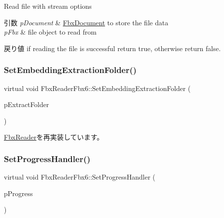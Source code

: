Read file with stream options 
\begin{DoxyParams}{引数}
{\em p\+Document} & \hyperlink{class_fbx_document}{Fbx\+Document} to store the file data \\
\hline
{\em p\+Fbx} & file object to read from \\
\hline
\end{DoxyParams}
\begin{DoxyReturn}{戻り値}
if reading the file is successful return {\ttfamily true}, otherwise return {\ttfamily false}. 
\end{DoxyReturn}
\mbox{\label{class_fbx_reader_fbx6_a574e93fb5fc9fd89050b11c383316ab2}} 
\subsubsection{\texorpdfstring{Set\+Embedding\+Extraction\+Folder()}{SetEmbeddingExtractionFolder()}}
{\footnotesize\ttfamily virtual void Fbx\+Reader\+Fbx6\+::\+Set\+Embedding\+Extraction\+Folder (\begin{DoxyParamCaption}\item[{const char $\ast$}]{p\+Extract\+Folder }\end{DoxyParamCaption})\hspace{0.3cm}{\ttfamily [virtual]}}



\hyperlink{class_fbx_reader_a640eef510ddb298b2eaad0545b79de66}{Fbx\+Reader}を再実装しています。

\mbox{\label{class_fbx_reader_fbx6_a85827a96cd550f6260854858766e4d96}} 
\subsubsection{\texorpdfstring{Set\+Progress\+Handler()}{SetProgressHandler()}}
{\footnotesize\ttfamily virtual void Fbx\+Reader\+Fbx6\+::\+Set\+Progress\+Handler (\begin{DoxyParamCaption}\item[{\hyperlink{class_fbx_progress}{Fbx\+Progress} $\ast$}]{p\+Progress }\end{DoxyParamCaption})\hspace{0.3cm}{\ttfamily [virtual]}}

